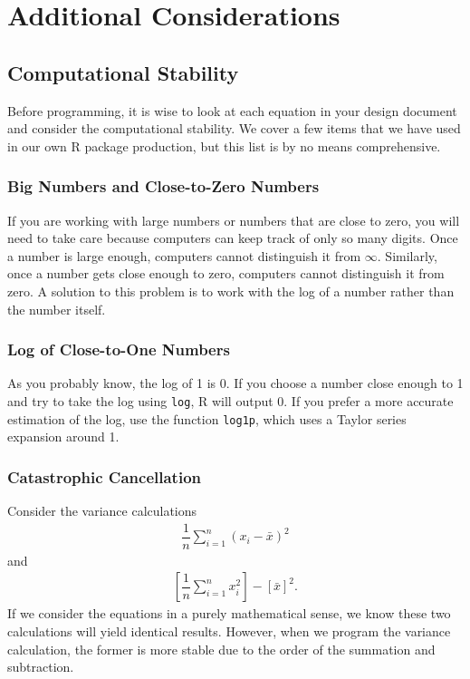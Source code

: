 \documentclass{article}
\begin{document}
\section{Additional Considerations}


\subsection{Computational Stability}
Before programming, it is wise to  look at each equation in your design document and consider the computational stability. We cover a few items that we have used in our own R package production, but this list is by no means comprehensive.

\subsubsection{Big Numbers and Close-to-Zero Numbers}
If you are working with large numbers or numbers that are close to zero, you will need to take care because computers can keep track of only so many digits. Once a number is large enough,  computers cannot distinguish it from $\infty$. Similarly, once a number gets close enough to zero, computers cannot distinguish it from zero. A solution to this problem is to work with the log of a  number rather  than the number itself. 

\subsubsection{Log of Close-to-One Numbers}
As you probably know, the log of 1 is 0. If you choose a number close enough to 1 and try to take the log   using \texttt{log}, R will output 0. If you prefer a more accurate estimation of the log, use the function \texttt{log1p}, which uses a Taylor series expansion around 1.


\subsubsection{Catastrophic Cancellation}

Consider the variance calculations
\begin{align*}
\dfrac{1}{n} \sum_{i=1}^n (x_i - \bar{x})^2 
\end{align*}
and
\begin{align*}
\left[ \dfrac{1}{n}  \sum_{i=1}^n x_i^2 \right] - \left[\bar{x} \right]^2 .
\end{align*}
If we consider the equations in a purely  mathematical sense, we know these two calculations will yield identical results. However, when we program the variance calculation, the former is more stable due to the order of the summation and subtraction.  \\
\end{document}
